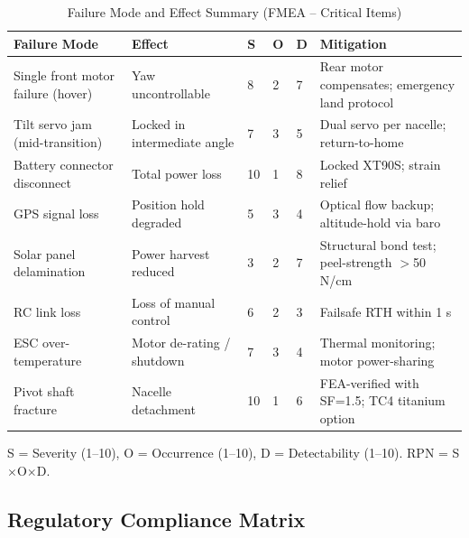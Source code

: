 \begin{table}[H]
\centering
\small
\caption{Failure Mode and Effect Summary (FMEA -- Critical Items)}
\begin{tabularx}{\textwidth}{L{3cm} L{3cm} C{1.2cm} C{1.2cm} C{1.2cm} X}
\toprule
\textbf{Failure Mode} &
\textbf{Effect} &
\textbf{S} &
\textbf{O} &
\textbf{D} &
\textbf{Mitigation} \\
\midrule
Single front motor failure (hover) & Yaw uncontrollable & 8 & 2 & 7 & Rear motor compensates; emergency land protocol \\
Tilt servo jam (mid-transition) & Locked in intermediate angle & 7 & 3 & 5 & Dual servo per nacelle; return-to-home \\
Battery connector disconnect & Total power loss & 10 & 1 & 8 & Locked XT90S; strain relief \\
GPS signal loss & Position hold degraded & 5 & 3 & 4 & Optical flow backup; altitude-hold via baro \\
Solar panel delamination & Power harvest reduced & 3 & 2 & 7 & Structural bond test; peel-strength $>$50 N/cm \\
RC link loss & Loss of manual control & 6 & 2 & 3 & Failsafe RTH within 1 s \\
ESC over-temperature & Motor de-rating / shutdown & 7 & 3 & 4 & Thermal monitoring; motor power-sharing \\
Pivot shaft fracture & Nacelle detachment & 10 & 1 & 6 & FEA-verified with SF=1.5; TC4 titanium option \\
\bottomrule
\end{tabularx}

\vspace{0.3em}
{\footnotesize S = Severity (1--10), O = Occurrence (1--10), D = Detectability (1--10). RPN = S$\times$O$\times$D.}
\end{table}

\subsection{Regulatory Compliance Matrix}

